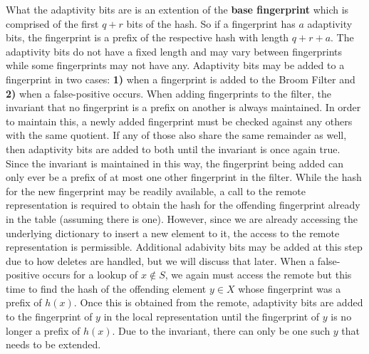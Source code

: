 \documentclass[../paper.tex]{subfiles}
\begin{document}
    What the adaptivity bits are is an extention of the {\bf base fingerprint}
    which is comprised of the first $q + r$ bits of the hash.  So if a
    fingerprint has $a$ adaptivity bits, the fingerprint is a prefix of the
    respective hash with length $q + r + a$. The adaptivity bits do not have a
    fixed length and may vary between fingerprints while some fingerprints may
    not have any.  Adaptivity bits may be added to a fingerprint in two cases:
    {\bf 1)} when a fingerprint is added to the Broom Filter and {\bf 2)} when
    a false-positive occurs.   When adding fingerprints to the filter, the
    invariant that no fingerprint is a prefix on another is always maintained.
    In order to maintain this, a newly added fingerprint must be checked
    against any others with the same quotient.  If any of those also share the
    same remainder as well, then adaptivity bits are added to both until the
    invariant is once again true.  Since the invariant is maintained in this
    way, the fingerprint being added can only ever be a prefix of at most one
    other fingerprint in the filter.   While the hash for the new fingerprint
    may be readily available, a call to the remote representation is required
    to obtain the hash for the offending fingerprint already in the table
    (assuming there is one).  However, since we are already accessing the
    underlying dictionary to insert a new element to it, the access to the
    remote representation is permissible.  Additional adabivity bits may be
    added at this step due to how deletes are handled, but we will discuss that
    later.  When a false-positive occurs for a lookup of $x \notin S$, we again
    must access the remote but this time to find the hash of the offending
    element $y \in X$ whose fingerprint was a prefix of $h(x)$.  Once this is
    obtained from the remote, adaptivity bits are added to the fingerprint of
    $y$ in the local representation until the fingerprint of $y$ is no longer a
    prefix of $h(x)$.  Due to the invariant, there can only be one such $y$
    that needs to be extended. 
	
\end{document}
